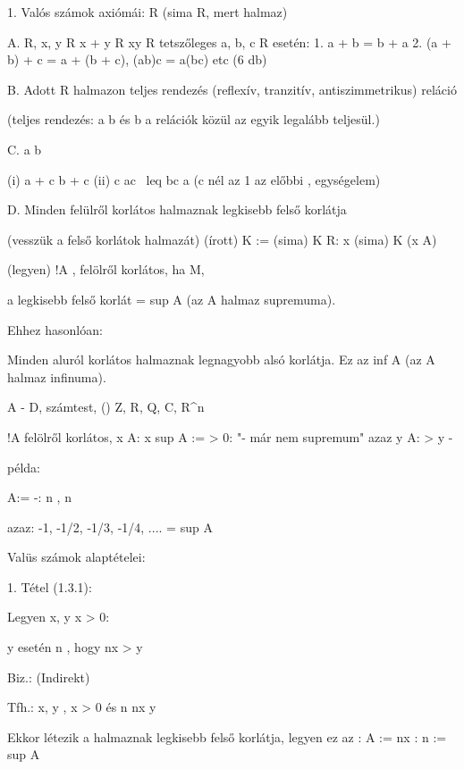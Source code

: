 
1. Valós számok axiómái:
R \neq \emptyset  (sima R, mert halmaz)

A.
\exists \theta \epsilon \in R, \forall x, y \in R
x + y \in R
xy \in R
tetszőleges a, b, c \in R esetén:
1. a + b = b + a
2. (a + b) + c = a + (b + c), (ab)c = a(bc) etc (6 db)

B.
Adott R halmazon \leq teljes rendezés (reflexív, tranzitív, antiszimmetrikus) reláció

(teljes rendezés: a \leq b és b \leq a relációk közül az egyik legalább teljesül.)

C.
a \leq b

(i) a + c \leq b + c
(ii) c  \Rightarrow ac \ leq bc
a (c  nél az 1 az előbbi \theta, egységelem)

D.
Minden felülről korlátos halmaznak \exists legkisebb felső korlátja

(vesszük a felső korlátok halmazát)
(írott) K := {(sima) K \in R: x \leq (sima) K (x \in A)}

(legyen) !A \neq \emptyset, felölről korlátos, ha {\exists}M,

a legkisebb felső korlát = sup A (az A halmaz supremuma).

Ehhez hasonlóan:

Minden aluról korlátos halmaznak \exists legnagyobb alsó korlátja.
Ez az inf A (az A halmaz infinuma).


A - D, \RIghtarrow számtest, (\mathbb) Z, R, Q, C, R^n

!A \neq \emptyset felölről korlátos, \forall x \in A: x \leq sup A := \alpha \iff
\iff \forall \epsilon > 0: "\aplha - \epsilon már nem supremum" azaz \exists y \in A: \alpha > y \geq \alpha - \epsilon

példa:

A:= { -: n \in {}, n }

azaz: -1, -1/2, -1/3, -1/4, ....    = sup A

Valüs számok alaptételei:

1. Tétel (1.3.1):

Legyen x, y \in {} x > 0:

\forall y \in {} esetén \exists n \in {}, hogy nx > y

Biz.: (Indirekt)

Tfh.: \exists x, y \in {}, x > 0 és \forall n \in {} nx \leq y

Ekkor létezik a halmaznak legkisebb felső korlátja, legyen ez az \alpha :
A := { nx : n \in {}}
\alpha := sup A

